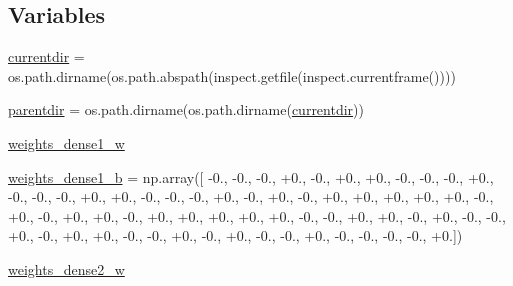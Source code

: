 \subsection*{Variables}
\begin{DoxyCompactItemize}
\item 
\hyperlink{namespacepybullet-gym_1_1pybulletgym_1_1examples_1_1roboschool-weights_1_1enjoy___t_f___inverted49df41add915758d6f92d022ad22e9f0_a8bb3f556c9ad725f22c2378da05aa277}{currentdir} = os.\+path.\+dirname(os.\+path.\+abspath(inspect.\+getfile(inspect.\+currentframe())))
\item 
\hyperlink{namespacepybullet-gym_1_1pybulletgym_1_1examples_1_1roboschool-weights_1_1enjoy___t_f___inverted49df41add915758d6f92d022ad22e9f0_ad50552e643c3c954a537376fff4386f8}{parentdir} = os.\+path.\+dirname(os.\+path.\+dirname(\hyperlink{namespacepybullet-gym_1_1pybulletgym_1_1examples_1_1roboschool-weights_1_1enjoy___t_f___inverted49df41add915758d6f92d022ad22e9f0_a8bb3f556c9ad725f22c2378da05aa277}{currentdir}))
\item 
\hyperlink{namespacepybullet-gym_1_1pybulletgym_1_1examples_1_1roboschool-weights_1_1enjoy___t_f___inverted49df41add915758d6f92d022ad22e9f0_a740e311dc93211b876f8429c3e621d6d}{weights\+\_\+dense1\+\_\+w}
\item 
\hyperlink{namespacepybullet-gym_1_1pybulletgym_1_1examples_1_1roboschool-weights_1_1enjoy___t_f___inverted49df41add915758d6f92d022ad22e9f0_a1d64284be56c4dded72779e67ee885ed}{weights\+\_\+dense1\+\_\+b} = np.\+array(\mbox{[} -\/0., -\/0., -\/0., +0., -\/0., +0., +0., -\/0., -\/0., -\/0., +0., -\/0., -\/0., -\/0., +0., +0., -\/0., -\/0., -\/0., +0., -\/0., +0., -\/0., +0., +0., +0., +0., +0., -\/0., +0., -\/0., +0., +0., -\/0., +0., +0., +0., +0., +0., -\/0., -\/0., +0., +0., -\/0., +0., -\/0., -\/0., +0., -\/0., +0., +0., -\/0., -\/0., +0., -\/0., +0., -\/0., -\/0., +0., -\/0., -\/0., -\/0., -\/0., +0.\mbox{]})
\item 
\hyperlink{namespacepybullet-gym_1_1pybulletgym_1_1examples_1_1roboschool-weights_1_1enjoy___t_f___inverted49df41add915758d6f92d022ad22e9f0_af9b4ede0418c292e92356aa542fff299}{weights\+\_\+dense2\+\_\+w}
\item 

\end{DoxyCompactItemize}
